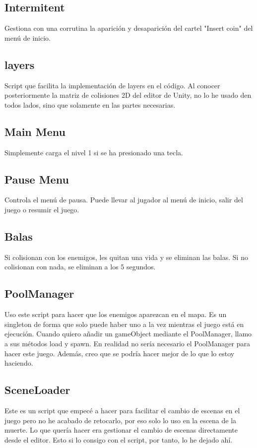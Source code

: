 \documentclass[titlepage, 4apaper]{article}
\begin{document}
\subsection{Intermitent}
Gestiona con una corrutina la aparición y desaparición del cartel "Insert coin" del menú de inicio.
\subsection{layers}
Script que facilita la implementación de layers en el código. Al conocer posteriormente la matriz de colisiones 2D del editor de Unity, no lo he usado den todos lados, sino que solamente en las partes necesarias.
\subsection{Main Menu}
Simplemente carga el nivel 1 si se ha presionado una tecla.
\subsection{Pause Menu}
Controla el menú de pausa. Puede llevar al jugador al menú de inicio, salir del juego o resumir el juego.
\subsection{Balas}
Si colisionan con los enemigos, les quitan una vida y se eliminan las balas. Si no colisionan con nada, se eliminan a los 5 segundos.
\subsection{PoolManager}
Uso este script para hacer que los enemigos aparezcan en el mapa. Es un singleton de forma que solo puede haber uno a la vez mientras el juego está en ejecución. Cuando quiero añadir un gameObject mediante el PoolManager, llamo a sus métodos load y spawn. En realidad no sería necesario el PoolManager para hacer este juego. Además, creo que se podría hacer mejor de lo que lo estoy haciendo.
\subsection{SceneLoader}
Este es un script que empecé a hacer para facilitar el cambio de escenas en el juego pero no he acabado de retocarlo, por eso solo lo uso en la escena de la muerte. Lo que quería hacer era gestionar el cambio de escenas directamente desde el editor. Esto si lo consigo con el script, por tanto, lo he dejado ahí.
\end{document}

